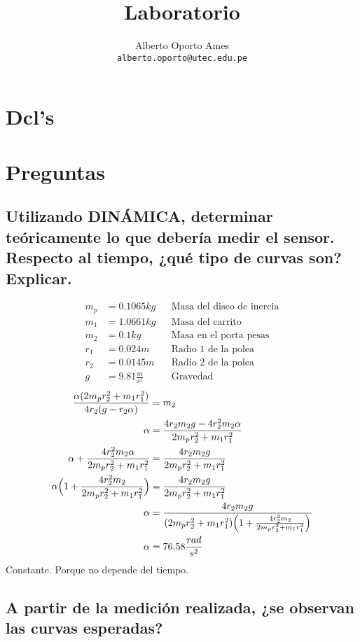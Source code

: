 \documentclass[12pt]{article}
\title{\textbf{Laboratorio}}
\author{
		Alberto Oporto Ames\\
		\texttt{alberto.oporto@utec.edu.pe}
		}
\begin{document}
\maketitle
\thispagestyle{fancy}

\section{Dcl's}%
\label{sub:dcl}
\begin{figure}[H]
	\centering
	
\end{figure}

\section{Preguntas}%
\subsection{Utilizando DINÁMICA, determinar teóricamente lo que debería medir el sensor.
Respecto al tiempo, ¿qué tipo de curvas son? Explicar.}%
\begin{align*}
	m_p &= 0.1065 kg && \text{Masa del disco de inercia}\\
	m_1 &= 1.0661 kg && \text{Masa del carrito}\\
	m_2 &= 0.1 kg && \text{Masa en el porta pesas}\\
	r_1 &= 0.024 m && \text{Radio 1 de la polea}\\
	r_2 &= 0.0145 m && \text{Radio 2 de la polea}\\
	g &= 9.81 \frac{m}{s^2}  && \text{Gravedad}
\end{align*}
\begin{align*}
	\frac{\alpha(2m_pr_2^2+m_1r_1^2)}{4r_2(g-r_2\alpha)} &= m_2\\
	\alpha &= \frac{4r_2m_2g-4r_2^2m_2\alpha}{2m_pr_2^2+m_1r_1^2}\\
	\alpha + \frac{4r_2^2m_2\alpha}{2m_pr_2^2+m_1r_1^2} &= \frac{4r_2m_2g}{2m_pr_2^2+m_1r_1^2}\\
	\alpha \Big{(}1 + \frac{4r_2^2m_2}{2m_pr_2^2+m_1r_1^2}\Big{)} &= \frac{4r_2m_2g}{2m_pr_2^2+m_1r_1^2}\\
	\alpha &= \frac{4r_2m_2g}{(2m_pr_2^2+m_1r_1^2)\Big{(}1 + \frac{4r_2^2m_2}{2m_pr_2^2+m_1r_1^2}\Big{)}}\\
	\alpha &= 76.58 \frac{rad}{s^2}
\end{align*}
Constante.
Porque no depende del tiempo.

\subsection{A partir de la medición realizada, ¿se observan las curvas esperadas?}%
\end{document}
